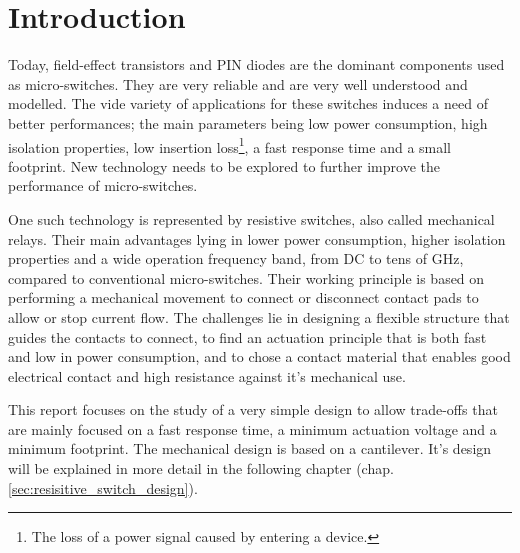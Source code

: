 \section{Introduction}
\label{sec:introduction}
Today, field-effect transistors and PIN diodes are the dominant components used as micro-switches. 
They are very reliable and are very well understood and modelled. 
The vide variety of applications for these switches induces a need of better performances; the main parameters being low power consumption, high isolation properties, low insertion loss\footnote{The loss of a power signal caused by entering a device.}, a fast response time and a small footprint.
New technology needs to be explored to further improve the performance of micro-switches.

One such technology is represented by resistive switches, also called mechanical relays.
Their main advantages lying in lower power consumption, higher isolation properties and a wide operation frequency band, from DC to tens of GHz, compared to conventional micro-switches.
Their working principle is based on performing a mechanical movement to connect or disconnect contact pads to allow or stop current flow.
The challenges lie in designing a flexible structure that guides the contacts to connect, to find an actuation principle that is both fast and low in power consumption, and to chose a contact material that enables good electrical contact and high resistance against it's mechanical use.

This report focuses on the study of a very simple design to allow trade-offs that are mainly focused on a fast response time, a minimum actuation voltage and a minimum footprint.
The mechanical design is based on a cantilever.
It's design will be explained in more detail in the following chapter (chap. \ref{sec:resisitive_switch_design}).\cite{shaw2012mems}
